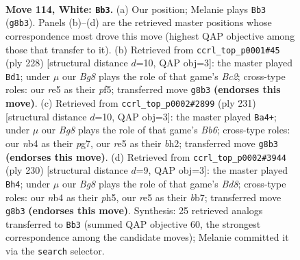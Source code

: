 \documentclass[11pt]{article}
\begin{document}
\clearpage

\begin{figure}[p]\centering
\begin{subfigure}{0.46\textwidth}\centering
\resizebox{\linewidth}{!}{%
\newchessgame
\chessboard[
  setfen={6B1/8/6k1/4r1p1/1n6/6K1/8/8 w - - 12 114},
  showmover=false,
  pgfstyle=straightmove, color=movearrow, markmove={g8-b3}
]}
\caption{}
\end{subfigure}\hfill
\begin{subfigure}{0.46\textwidth}\centering
\resizebox{\linewidth}{!}{%
\newchessgame
\chessboard[
  setfen={8/8/8/5pk1/2n2p2/8/2B2K2/8 w - - 40 115},
  showmover=false,
  pgfstyle=straightmove, color=movearrow, markmove={c2-d1}
]}
\caption{}
\end{subfigure}
\\[4pt]
\begin{subfigure}{0.46\textwidth}\centering
\resizebox{\linewidth}{!}{%
\newchessgame
\chessboard[
  setfen={3k4/6P1/2KP4/8/8/1b6/7B/8 b - - 16 116},
  showmover=false,
  pgfstyle=straightmove, color=movearrow, markmove={b3-a4}
]}
\caption{}
\end{subfigure}\hfill
\begin{subfigure}{0.46\textwidth}\centering
\resizebox{\linewidth}{!}{%
\newchessgame
\chessboard[
  setfen={3B4/1b6/8/5k1p/5p2/8/5K2/8 w - - 78 116},
  showmover=false,
  pgfstyle=straightmove, color=movearrow, markmove={d8-h4}
]}
\caption{}
\end{subfigure}
\caption{\textbf{Move 114, White: \texttt{Bb3}.} (a) Our position; Melanie plays \texttt{Bb3} (\texttt{g8b3}). Panels (b)--(d) are the retrieved master positions whose correspondence most drove this move (highest QAP objective among those that transfer to it). (b) Retrieved from \texttt{ccrl\_top\_p0001\#45} (ply 228) [structural distance $d$=10, QAP obj=3]: the master played \texttt{Bd1}; under $\mu$ our \emph{Bg8} plays the role of that game's \emph{Bc2}; cross-type roles: our \emph{r}e5 as their \emph{p}f5; transferred move \texttt{g8b3} \textbf{(endorses this move)}. (c) Retrieved from \texttt{ccrl\_top\_p0002\#2899} (ply 231) [structural distance $d$=10, QAP obj=3]: the master played \texttt{Ba4+}; under $\mu$ our \emph{Bg8} plays the role of that game's \emph{Bb6}; cross-type roles: our \emph{n}b4 as their \emph{p}g7, our \emph{r}e5 as their \emph{b}h2; transferred move \texttt{g8b3} \textbf{(endorses this move)}. (d) Retrieved from \texttt{ccrl\_top\_p0002\#3944} (ply 230) [structural distance $d$=9, QAP obj=3]: the master played \texttt{Bh4}; under $\mu$ our \emph{Bg8} plays the role of that game's \emph{Bd8}; cross-type roles: our \emph{n}b4 as their \emph{p}h5, our \emph{r}e5 as their \emph{b}b7; transferred move \texttt{g8b3} \textbf{(endorses this move)}. Synthesis: 25 retrieved analogs transferred to \texttt{Bb3} (summed QAP objective 60, the strongest correspondence among the candidate moves); Melanie committed it via the \texttt{search} selector.}
\label{fig:thought-m226}
\end{figure}
\end{document}
